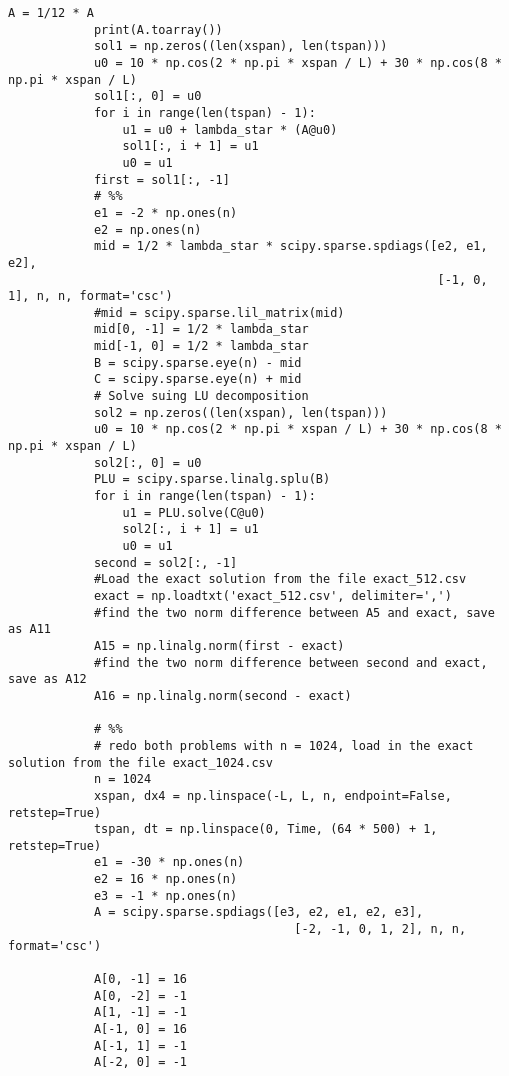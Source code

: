 \documentclass[a4paper,12pt, fleqn]{article}
\begin{document}
\begin{enumerate}
\begin{lstlisting}[basicstyle=\tiny]
            A = 1/12 * A
            print(A.toarray())
            sol1 = np.zeros((len(xspan), len(tspan)))
            u0 = 10 * np.cos(2 * np.pi * xspan / L) + 30 * np.cos(8 * np.pi * xspan / L)
            sol1[:, 0] = u0
            for i in range(len(tspan) - 1):
                u1 = u0 + lambda_star * (A@u0)
                sol1[:, i + 1] = u1 
                u0 = u1
            first = sol1[:, -1]
            # %%
            e1 = -2 * np.ones(n)
            e2 = np.ones(n)
            mid = 1/2 * lambda_star * scipy.sparse.spdiags([e2, e1, e2],
                                                            [-1, 0, 1], n, n, format='csc')
            #mid = scipy.sparse.lil_matrix(mid)
            mid[0, -1] = 1/2 * lambda_star
            mid[-1, 0] = 1/2 * lambda_star
            B = scipy.sparse.eye(n) - mid
            C = scipy.sparse.eye(n) + mid
            # Solve suing LU decomposition
            sol2 = np.zeros((len(xspan), len(tspan)))
            u0 = 10 * np.cos(2 * np.pi * xspan / L) + 30 * np.cos(8 * np.pi * xspan / L)
            sol2[:, 0] = u0
            PLU = scipy.sparse.linalg.splu(B)
            for i in range(len(tspan) - 1):
                u1 = PLU.solve(C@u0)
                sol2[:, i + 1] = u1
                u0 = u1
            second = sol2[:, -1]
            #Load the exact solution from the file exact_512.csv
            exact = np.loadtxt('exact_512.csv', delimiter=',')
            #find the two norm difference between A5 and exact, save as A11
            A15 = np.linalg.norm(first - exact)
            #find the two norm difference between second and exact, save as A12
            A16 = np.linalg.norm(second - exact)

            # %%
            # redo both problems with n = 1024, load in the exact solution from the file exact_1024.csv
            n = 1024
            xspan, dx4 = np.linspace(-L, L, n, endpoint=False, retstep=True)
            tspan, dt = np.linspace(0, Time, (64 * 500) + 1, retstep=True)
            e1 = -30 * np.ones(n)
            e2 = 16 * np.ones(n)
            e3 = -1 * np.ones(n)
            A = scipy.sparse.spdiags([e3, e2, e1, e2, e3],
                                        [-2, -1, 0, 1, 2], n, n, format='csc')

            A[0, -1] = 16
            A[0, -2] = -1
            A[1, -1] = -1
            A[-1, 0] = 16
            A[-1, 1] = -1
            A[-2, 0] = -1


\end{lstlisting}
\end{enumerate}
\end{document}
